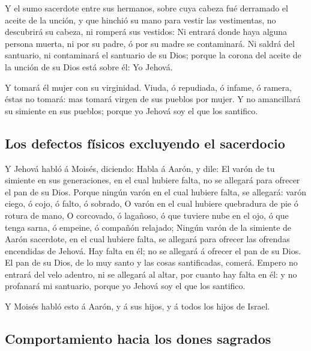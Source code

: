  Y el sumo sacerdote entre sus hermanos, sobre cuya
cabeza fué derramado el aceite de la unción, y que hinchió su mano para
vestir las vestimentas, no descubrirá su cabeza, ni romperá sus
vestidos:  Ni entrará donde haya alguna persona muerta,
ni por su padre, ó por su madre se contaminará.  Ni
saldrá del santuario, ni contaminará el santuario de su Dios; porque la
corona del aceite de la unción de su Dios está sobre él: Yo Jehová.

 Y tomará él mujer con su virginidad. 
Viuda, ó repudiada, ó infame, ó ramera, éstas no tomará: mas tomará
virgen de sus pueblos por mujer.  Y no amancillará su
simiente en sus pueblos; porque yo Jehová soy el que los santifico.

\hypertarget{los-defectos-fuxedsicos-excluyendo-el-sacerdocio}{%
\subsection{Los defectos físicos excluyendo el
sacerdocio}\label{los-defectos-fuxedsicos-excluyendo-el-sacerdocio}}

 Y Jehová habló á Moisés, diciendo:  Habla
á Aarón, y dile: El varón de tu simiente en sus generaciones, en el cual
hubiere falta, no se allegará para ofrecer el pan de su Dios.
 Porque ningún varón en el cual hubiere falta, se
allegará: varón ciego, ó cojo, ó falto, ó sobrado,  O
varón en el cual hubiere quebradura de pie ó rotura de mano,
 O corcovado, ó lagañoso, ó que tuviere nube en el ojo, ó
que tenga sarna, ó empeine, ó compañón relajado;  Ningún
varón de la simiente de Aarón sacerdote, en el cual hubiere falta, se
allegará para ofrecer las ofrendas encendidas de Jehová. Hay falta en
él; no se allegará á ofrecer el pan de su Dios.  El pan
de su Dios, de lo muy santo y las cosas santificadas, comerá.
 Empero no entrará del velo adentro, ni se allegará al
altar, por cuanto hay falta en él: y no profanará mi santuario, porque
yo Jehová soy el que los santifico.

 Y Moisés habló esto á Aarón, y á sus hijos, y á todos
los hijos de Israel.

\hypertarget{comportamiento-hacia-los-dones-sagrados}{%
\subsection{Comportamiento hacia los dones
sagrados}\label{comportamiento-hacia-los-dones-sagrados}}


